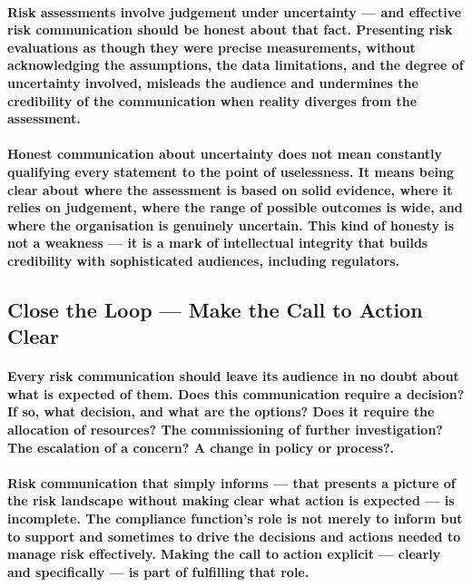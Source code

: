 \paragraph{Risk assessments involve judgement under uncertainty — and effective risk communication should be honest about that fact. Presenting risk evaluations as though they were precise measurements, without acknowledging the assumptions, the data limitations, and the degree of uncertainty involved, misleads the audience and undermines the credibility of the communication when reality diverges from the assessment.}
\paragraph{Honest communication about uncertainty does not mean constantly qualifying every statement to the point of uselessness. It means being clear about where the assessment is based on solid evidence, where it relies on judgement, where the range of possible outcomes is wide, and where the organisation is genuinely uncertain. This kind of honesty is not a weakness — it is a mark of intellectual integrity that builds credibility with sophisticated audiences, including regulators.}

\subsection{Close the Loop — Make the Call to Action Clear}
\paragraph{Every risk communication should leave its audience in no doubt about what is expected of them. Does this communication require a decision? If so, what decision, and what are the options? Does it require the allocation of resources? The commissioning of further investigation? The escalation of a concern? A change in policy or process?.}
\paragraph{Risk communication that simply informs — that presents a picture of the risk landscape without making clear what action is expected — is incomplete. The compliance function's role is not merely to inform but to support and sometimes to drive the decisions and actions needed to manage risk effectively. Making the call to action explicit — clearly and specifically — is part of fulfilling that role.}

